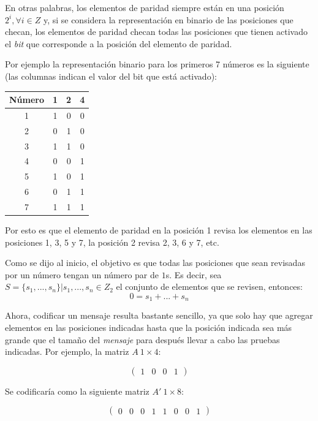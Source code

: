 \documentclass{article}
\begin{document}
En otras palabras, los elementos de paridad siempre están en una posición $2^i, \forall i \in Z$ y, si se considera la representación en binario de las posiciones que checan, los elementos de paridad checan todas las posiciones que tienen activado el \textit{bit} que corresponde a la posición del elemento de paridad.

Por ejemplo la representación binario para los primeros 7 números es la siguiente (las columnas indican el valor del bit que está activado):

\begin{center}
    \begin{tabular}{|c||c|c|c|}
        \hline
        Número & 1 & 2 & 4 \\
        \hline
        1 & 1 & 0 & 0 \\
        2 & 0 & 1 & 0 \\
        3 & 1 & 1 & 0 \\
        4 & 0 & 0 & 1 \\
        5 & 1 & 0 & 1 \\
        6 & 0 & 1 & 1 \\
        7 & 1 & 1 & 1 \\
        \hline
    \end{tabular}
\end{center}

Por esto es que el elemento de paridad en la posición 1 revisa los elementos en las posiciones 1, 3, 5 y 7, la posición 2 revisa 2, 3, 6 y 7, etc. 

Como se dijo al inicio, el objetivo es que todas las posiciones que sean revisadas por un número tengan un número par de $1$s. Es decir, sea $S = \{ s_1, ..., s_n \} | s_1, ..., s_n \in Z_2$ el conjunto de elementos que se revisen, entonces:
$$
0 = s_1 + ... + s_n
$$

Ahora, codificar un mensaje resulta bastante sencillo, ya que solo hay que agregar elementos en las posiciones indicadas hasta que la posición indicada sea más grande que el tamaño del \textit{mensaje} para después llevar a cabo las pruebas indicadas. Por ejemplo, la matriz $A\ 1 \times 4$:

$$
\begin{pmatrix}
    1 & 0 & 0 & 1
\end{pmatrix}
$$

Se codificaría como la siguiente matriz $A'\ 1 \times 8$:

$$
\begin{pmatrix}
    0 & 0 & 0 & 1 & 1 & 0 & 0 & 1
\end{pmatrix}
$$
\end{document}
